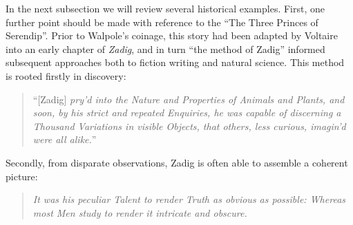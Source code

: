 In the next subsection we will review several historical examples.
First, one further point should be made with reference to the ``The
Three Princes of Serendip''.  Prior to Walpole's coinage, this story
had been adapted by Voltaire into an early chapter of \emph{Zadig},
and in turn ``the method of Zadig'' informed subsequent approaches
both to fiction writing and natural science.  This method is rooted
firstly in discovery:

\begin{quote}
``[Zadig] \emph{pry’d into the Nature and Properties of Animals and
    Plants, and soon, by his strict and repeated Enquiries, he was
    capable of discerning a Thousand Variations in visible Objects,
    that others, less curious, imagin’d were all
    alike.}''~\cite[pp. 21--22]{zadig}
\end{quote}

\noindent Secondly, from disparate observations, Zadig is often able
to assemble a coherent picture:
\begin{quote}
\emph{It was his peculiar Talent to render Truth as obvious as
  possible: Whereas most Men study to render it intricate and
  obscure.}~\cite[p. 54]{zadig}
\end{quote}
